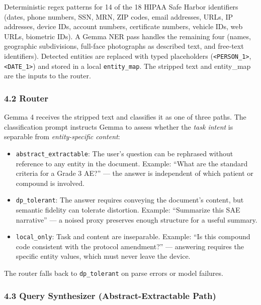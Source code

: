 Deterministic regex patterns for 14 of the 18 HIPAA Safe Harbor
identifiers (dates, phone numbers, SSN, MRN, ZIP codes, email addresses,
URLs, IP addresses, device IDs, account numbers, certificate numbers,
vehicle IDs, web URLs, biometric IDs). A Gemma NER pass handles the
remaining four (names, geographic subdivisions, full-face photographs as
described text, and free-text identifiers). Detected entities are
replaced with typed placeholders
(\texttt{\textless{}PERSON\_1\textgreater{}},
\texttt{\textless{}DATE\_1\textgreater{}}) and stored in a local
\texttt{entity\_map}. The stripped text and entity\_map are the inputs
to the router.

\subsubsection{4.2 Router}\label{router}

Gemma 4 receives the stripped text and classifies it as one of three
paths. The classification prompt instructs Gemma to assess whether the
\emph{task intent} is separable from \emph{entity-specific content}:

\begin{itemize}
\tightlist
\item
  \texttt{abstract\_extractable}: The user's question can be rephrased
  without reference to any entity in the document. Example: ``What are
  the standard criteria for a Grade 3 AE?'' --- the answer is
  independent of which patient or compound is involved.
\item
  \texttt{dp\_tolerant}: The answer requires conveying the document's
  content, but semantic fidelity can tolerate distortion. Example:
  ``Summarize this SAE narrative'' --- a noised proxy preserves enough
  structure for a useful summary.
\item
  \texttt{local\_only}: Task and content are inseparable. Example: ``Is
  this compound code consistent with the protocol amendment?'' ---
  answering requires the specific entity values, which must never leave
  the device.
\end{itemize}

The router falls back to \texttt{dp\_tolerant} on parse errors or model
failures.

\subsubsection{4.3 Query Synthesizer (Abstract-Extractable
Path)}\label{query-synthesizer-abstract-extractable-path}

